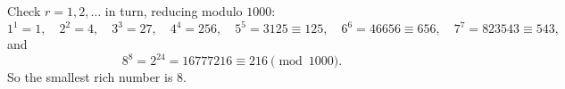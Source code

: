 Check $r=1,2,\dots$ in turn, reducing modulo $1000$:
\[
1^1=1,\quad 2^2=4,\quad 3^3=27,\quad 4^4=256,\quad 5^5=3125\equiv125,\quad 6^6=46656\equiv656,\quad 7^7=823543\equiv543,
\]
and
\[
8^8=2^{24}=16777216\equiv216\pmod{1000}.
\]
So the smallest rich number is $\boxed{8}$.
